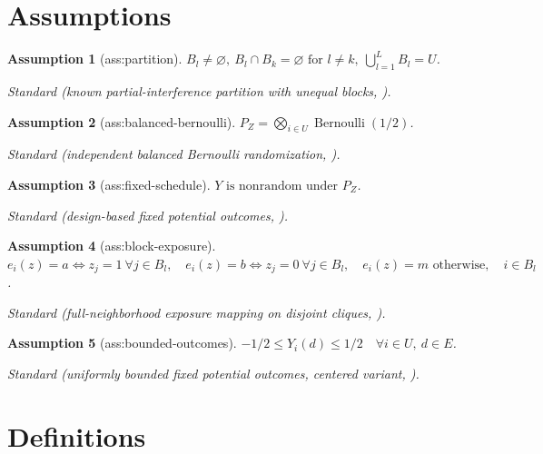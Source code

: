 \documentclass{article}
\newtheorem{assumption}{Assumption}
\begin{document}
\section{Assumptions}

\begin{assumption}[ass:partition]\label{ass:partition}
\(B_l\ne\varnothing,\ B_l\cap B_k=\varnothing\text{ for }l\ne k,\ \bigcup_{l=1}^LB_l=U\).
\par\smallskip\noindent\emph{Standard} (known partial-interference partition with unequal blocks, \cite{TchetgenTchetgenVanderWeele2012}).
\end{assumption}

\begin{assumption}[ass:balanced-bernoulli]\label{ass:balanced-bernoulli}
\(P_Z=\bigotimes_{i\in U}\operatorname{Bernoulli}(1/2)\).
\par\smallskip\noindent\emph{Standard} (independent balanced Bernoulli randomization, \cite{AronowSamii2017}).
\end{assumption}

\begin{assumption}[ass:fixed-schedule]\label{ass:fixed-schedule}
\(Y\text{ is nonrandom under }P_Z\).
\par\smallskip\noindent\emph{Standard} (design-based fixed potential outcomes, \cite{AronowSamii2017}).
\end{assumption}

\begin{assumption}[ass:block-exposure]\label{ass:block-exposure}
\(e_i(z)=a\iff z_j=1\ \forall j\in B_l,\quad e_i(z)=b\iff z_j=0\ \forall j\in B_l,\quad e_i(z)=m\text{ otherwise},\quad i\in B_l\).
\par\smallskip\noindent\emph{Standard} (full-neighborhood exposure mapping on disjoint cliques, \cite{UganderKarrerBackstromKleinberg2013}).
\end{assumption}

\begin{assumption}[ass:bounded-outcomes]\label{ass:bounded-outcomes}
\(-1/2\le Y_i(d)\le1/2\quad\forall i\in U,\ d\in E\).
\par\smallskip\noindent\emph{Standard} (uniformly bounded fixed potential outcomes, centered variant, \cite{AronowSamii2017}).
\end{assumption}

\section{Definitions}
\end{document}
